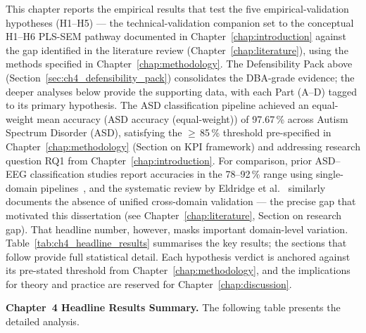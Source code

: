 This chapter reports the empirical results that test the five empirical-validation hypotheses (H1--H5) — the technical-validation companion set to the conceptual H1--H6 PLS-SEM pathway documented in Chapter~\ref{chap:introduction} against the gap identified in the literature review (Chapter~\ref{chap:literature}), using the methods specified in Chapter~\ref{chap:methodology}. The Defensibility Pack above (Section~\ref{sec:ch4_defensibility_pack}) consolidates the DBA-grade evidence; the deeper analyses below provide the supporting data, with each Part (A--D) tagged to its primary hypothesis. The ASD classification pipeline achieved an equal-weight mean accuracy (ASD accuracy (equal-weight)) of 97.67\,\% across Autism Spectrum Disorder (ASD), satisfying the $\geq$\,85\,\% threshold pre-specified in Chapter~\ref{chap:methodology} (Section on KPI framework) and addressing research question RQ1 from Chapter~\ref{chap:introduction}. For comparison, prior ASD--EEG classification studies report accuracies in the 78--92\,\% range using single-domain pipelines~\cite{bosl2018eeg, ari2022asd, kang2020asd, duffy2019eeg}, and the systematic review by Eldridge et al.~\cite{eldridge2014asd} similarly documents the absence of unified cross-domain validation --- the precise gap that motivated this dissertation (see Chapter~\ref{chap:literature}, Section on research gap). That headline number, however, masks important domain-level variation. Table~\ref{tab:ch4_headline_results} summarises the key results; the sections that follow provide full statistical detail. Each hypothesis verdict is anchored against its pre-stated threshold from Chapter~\ref{chap:methodology}, and the implications for theory and practice are reserved for Chapter~\ref{chap:discussion}.

\label{tab:respondent_profile}
\label{tab:eeg_dataset_summary}
\label{tab:eeg_kpi}
\label{tab:mc_eeg_results}
\label{tab:domain_readiness}
\iffalse %

\noindent\textbf{Chapter~4 Headline Results Summary.} The following table presents the detailed analysis.

